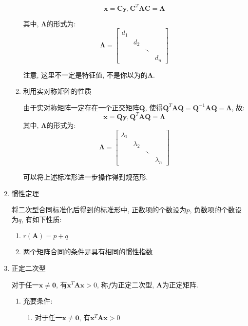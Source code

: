 \begin{enumerate}
\begin{enumerate}
\begin{equation*}
\bm{x}=\bm{C}\bm{y}, \bm{C}^{T}\bm{A}\bm{C}=\bm{\Lambda}
\end{equation*}\par
其中, $\bm{\Lambda}$的形式为:
\begin{equation*}
\bm{\Lambda}=\begin{bmatrix}
d_1 &  &  &  \\
& d_2 &  &  \\
&  & \ddots &  \\
&  &  & d_n
\end{bmatrix}
\end{equation*}\par
注意, 这里不一定是特征值, 不是你以为的$\bm{\Lambda}$.
\item 利用实对称矩阵的性质 \par
由于实对称矩阵一定存在一个正交矩阵$\bm{Q}$, 使得$\bm{Q}^{T}\bm{A}\bm{Q}=\bm{Q}^{-1}\bm{A}\bm{Q}=\bm{\Lambda}$, 故:
\begin{equation*}
\bm{x}=\bm{Q}\bm{y}, \bm{Q}^{T}\bm{A}\bm{Q}=\bm{\Lambda}
\end{equation*}
其中, $\bm{\Lambda}$的形式为:
\begin{equation*}
\bm{\Lambda}=\begin{bmatrix}
\lambda_1 &  &  &  \\
& \lambda_2 &  &  \\
&  & \ddots &  \\
&  &  & \lambda_n
\end{bmatrix}
\end{equation*}\par
可以将上述标准形进一步操作得到规范形.
\end{enumerate}
\item 惯性定理 \par
将二次型合同标准化后得到的标准形中, 正数项的个数设为$p$, 负数项的个数设为$q$, 有如下性质:
\begin{enumerate}
\item $r(\bm{A})=p+q$
\item 两个矩阵合同的条件是具有相同的惯性指数
\end{enumerate}
\item 正定二次型 \par
对于任一$\bm{x}\neq \bm{0}$, 有$\bm{x}^{T}\bm{A}\bm{x}>0$, 称$f$为正定二次型, $\bm{A}$为正定矩阵.
\begin{enumerate}
\item 充要条件:
\begin{enumerate}
\item 对于任一$\bm{x}\neq \bm{0}$, 有$\bm{x}^{T}\bm{A}\bm{x}>0$

\end{enumerate}
\end{enumerate}
\end{enumerate}

